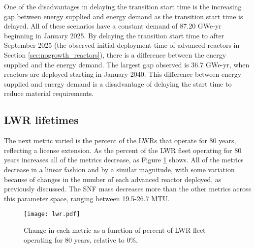 One of the disadvantages in delaying the transition start time is the 
increasing gap between energy supplied and energy demand as the transition 
start time is delayed. All of these scenarios have a constant demand 
of 87.20 GWe-yr beginning in January 2025. By delaying the transition start 
time to after September 2025 (the observed initial deployment time of advanced 
reactors in Section \ref{sec:nogrowth_reactors}), there is a difference
between the energy supplied and the energy demand. The largest gap observed 
is 36.7
GWe-yr, when reactors are deployed starting in January 2040. This difference 
between energy supplied and energy demand is a disadvantage of delaying 
the start time to reduce material requirements. 

\subsection{LWR lifetimes}
The next metric varied is the percent of the \glspl{LWR} that operate for 
80 years, reflecting a license extension. As the percent of the \gls{LWR} 
fleet operating for 80 years increases all of the metrics decrease, as 
Figure \ref{fig:lwr_scenario7} shows. All of the metrics decrease 
in a linear fashion and by a similar magnitude, with some variation because 
of changes in the number of each advanced reactor deployed, as previously
discussed. The \gls{SNF} mass decreases more than the other metrics across 
this parameter space, ranging between 19.5-26.7 MTU.

\begin{figure}[h!]
    \centering
    \texttt{[image: lwr.pdf]}
    \caption{Change in each metric as a function of percent of LWR fleet  
    operating for 80 years, relative to 0\%.}
    \label{fig:lwr_scenario7}
\end{figure}

